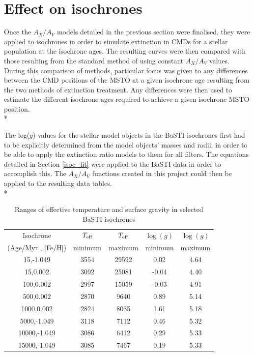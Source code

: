 \documentclass[12pt, a4paper]{report}
\begin{document}
\section{Effect on isochrones} \label{result_CMDs}
Once the $A_{X}/A_{V}$ models detailed in the previous section were finalised, they were applied to isochrones in order to simulate extinction in CMDs for a stellar population at the isochrone ages. The resulting curves were then compared with those resulting from the standard method of using constant $A_{X}/A_{V}$ values. During this comparison of methods, particular focus was given to any differences between the CMD positions of the MSTO at a given isochrone age resulting from the two methods of extinction treatment. Any differences were then used to estimate the different isochrone ages required to achieve a given isochrone MSTO position. \\*
 
The log($g$) values for the stellar model objects in the BaSTI isochrones first had to be explicitly determined from the model objects' masses and radii, in order to be able to apply the extinction ratio models to them for all filters. The equations detailed in Section \ref{isoc_fit} were applied to the BaSTI data in order to accomplish this. The $A_{X}/A_{V}$ functions created in this project could then be applied to the resulting data tables. \\*


\begin{table}
\begin{center}
\begin{tabular}{ccccc}
\hline
Isochrone & $T_{\textnormal{eff}}$ & $T_{\textnormal{eff}}$ & $\log(g)$ & $\log(g)$ \\
(Age/Myr , [Fe/H]) & minimum & maximum & minimum & maximum \\
\hline
15,-1.049 & 3554 & 29592 & 0.02 & 4.64 \\
15,0.002 & 3092 & 25081 & -0.04 & 4.40 \\
100,0.002 & 2997 & 15059 & -0.03 & 4.91 \\
500,0.002 & 2870 & 9640 & 0.89 & 5.14 \\
1000,0.002 & 2824 & 8035 & 1.61 & 5.18 \\
5000,-1.049 & 3118 & 7112 & 0.46 & 5.32 \\
10000,-1.049 & 3086 & 6412 & 0.29 & 5.33 \\
15000,-1.049 & 3085 & 7467 & 0.19 & 5.33 \\
\hline
\end{tabular}
\caption{Ranges of effective temperature and surface gravity in selected BaSTI isochrones}
\label{isoc_variable_ranges}
\end{center}
\end{table}
\end{document}
